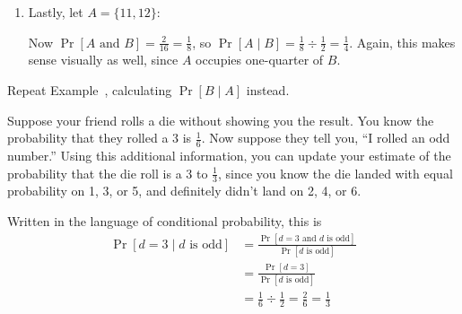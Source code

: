 \begin{example}
\begin{enumerate}
        \item Lastly, let $A = \{11,12\}$:
            \begin{center}
            \end{center}

            Now $\Pr[A \text{ and } B] = \frac{2}{16} = \frac{1}{8}$, so $\Pr[A \mid B]
            = \frac{1}{8} \div \frac{1}{2} = \frac{1}{4}$. Again, this makes 
            sense visually as well, since $A$ occupies one-quarter of $B$.
    \end{enumerate}
\end{example}

\begin{exercise}
    Repeat Example~, calculating $\Pr[B \mid A]$ instead.
\end{exercise}

\begin{example}
    Suppose your friend rolls a die without showing you the result.
    You know the probability that they rolled a 3 is $\frac{1}{6}$. Now 
    suppose they tell you, ``I rolled an odd number.'' Using this additional 
    information, you can update your estimate of the probability that the 
    die roll is a 3 to $\frac{1}{3}$, since you know the die landed with 
    equal probability on 1, 3, or 5, and definitely didn't land on 2, 4, 
    or 6.

    Written in the language of conditional probability, this is
    \begin{align*}
        \Pr[d = 3 \mid d \text{ is odd}] 
        &= \frac{
                \Pr[d=3 \text{ and } d \text{ is odd}]
            }{
                \Pr[d \text{ is odd}]
            }\\
        &= \frac{
                \Pr[d=3]
            }{
                \Pr[d \text{ is odd}]
            }\\
        &= \frac{1}{6} \div \frac{1}{2} = \frac{2}{6} = \frac{1}{3}
    \end{align*}
\end{example}

